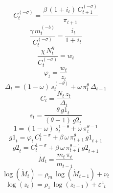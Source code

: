 \noindent[name= `1']
\begin{dmath}
{C}_{t}^{\left(-{\sigma}\right)}=\frac{{\beta}\, \left(1+{i}_{t}\right)\, {C}_{t+1}^{\left(-{\sigma}\right)}}{{\pi}_{t+1}}
\end{dmath}
\noindent[name= `2']
\begin{dmath}
\frac{{\gamma}\, {m}_{t}^{\left(-{b}\right)}}{{C}_{t}^{\left(-{\sigma}\right)}}=\frac{{i}_{t}}{1+{i}_{t}}
\end{dmath}
\noindent[name= `3']
\begin{dmath}
\frac{{\chi}\, {N}_{t}^{{\eta}}}{{C}_{t}^{\left(-{\sigma}\right)}}={w}_{t}
\end{dmath}
\noindent[name= `phi']
\begin{dmath}
{\varphi}_{t}=\frac{{w}_{t}}{{z}_{t}}
\end{dmath}
\noindent[name= `Delta']
\begin{dmath}
{\Delta}_{t}=\left(1-{\omega}\right)\, {s}_{t}^{\left(-{\theta}\right)}+{\omega}\, {\pi}_{t}^{{\theta}}\, {\Delta}_{t-1}
\end{dmath}
\noindent[name= `c']
\begin{dmath}
{C}_{t}=\frac{{N}_{t}\, {z}_{t}}{{\Delta}_{t}}
\end{dmath}
\noindent[name= `s']
\begin{dmath}
{s}_{t}=\frac{{\theta}\, {g1}_{t}}{\left({\theta}-1\right)\, {g2}_{t}}
\end{dmath}
\noindent[name= `8']
\begin{dmath}
1=\left(1-{\omega}\right)\, {s}_{t}^{1-{\theta}}+{\omega}\, {\pi}_{t}^{{\theta}-1}
\end{dmath}
\noindent[name= `g1']
\begin{dmath}
{g1}_{t}={\varphi}_{t}\, {C}_{t}^{1-{\sigma}}+{\beta}\, {\omega}\, {\pi}_{t+1}^{{\theta}}\, {g1}_{t+1}
\end{dmath}
\noindent[name= `g2']
\begin{dmath}
{g2}_{t}={C}_{t}^{1-{\sigma}}+{\beta}\, {\omega}\, {\pi}_{t+1}^{{\theta}-1}\, {g2}_{t+1}
\end{dmath}
\noindent[name= `m\_dot']
\begin{dmath}
{\dot{M}}_{t}=\frac{{m}_{t}\, {\pi}_{t}}{{m}_{t-1}}
\end{dmath}
\noindent[name= `12']
\begin{dmath}
\log\left({\dot{M}}_{t}\right)={\rho_{m}}\, \log\left({\dot{M}}_{t-1}\right)+{\nu}_{t}
\end{dmath}
\noindent[name= `13']
\begin{dmath}
\log\left({z}_{t}\right)={\rho_z}\, \log\left({z}_{t-1}\right)+{\varepsilon^{z}}_{t}
\end{dmath}
